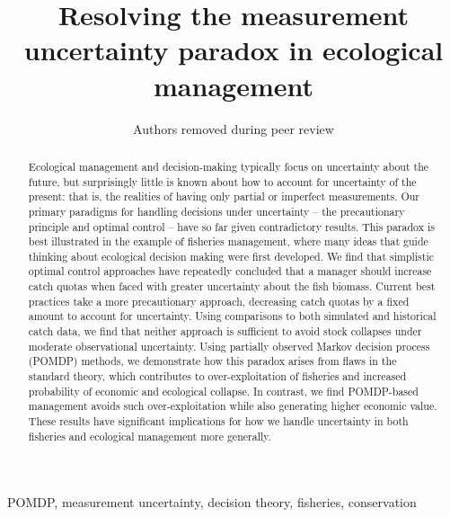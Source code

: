 \documentclass[3p]{elsarticle} %
\begin{document}
\begin{frontmatter}

  \title{Resolving the measurement uncertainty paradox in ecological management}
    \author[]{Authors removed during peer review}
  
  
    
  \begin{abstract}
  Ecological management and decision-making typically focus on uncertainty
  about the future, but surprisingly little is known about how to account
  for uncertainty of the present: that is, the realities of having only
  partial or imperfect measurements. Our primary paradigms for handling
  decisions under uncertainty -- the precautionary principle and optimal
  control -- have so far given contradictory results. This paradox is best
  illustrated in the example of fisheries management, where many ideas
  that guide thinking about ecological decision making were first
  developed. We find that simplistic optimal control approaches have
  repeatedly concluded that a manager should increase catch quotas when
  faced with greater uncertainty about the fish biomass. Current best
  practices take a more precautionary approach, decreasing catch quotas by
  a fixed amount to account for uncertainty. Using comparisons to both
  simulated and historical catch data, we find that neither approach is
  sufficient to avoid stock collapses under moderate observational
  uncertainty. Using partially observed Markov decision process (POMDP)
  methods, we demonstrate how this paradox arises from flaws in the
  standard theory, which contributes to over-exploitation of fisheries and
  increased probability of economic and ecological collapse. In contrast,
  we find POMDP-based management avoids such over-exploitation while also
  generating higher economic value. These results have significant
  implications for how we handle uncertainty in both fisheries and
  ecological management more generally.
  \end{abstract}
   \begin{keyword} POMDP, measurement uncertainty, decision theory, fisheries, conservation\end{keyword}
 \end{frontmatter}
\end{document}
